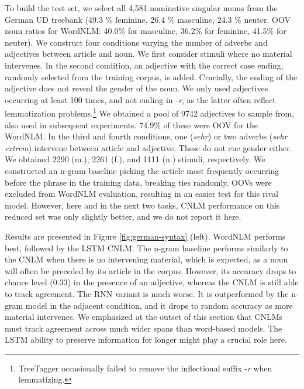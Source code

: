 To build the test set, we select all 4,581 nominative singular nouns
from the German UD treebank (49.3 \% feminine, 26.4 \% masculine, 24.3
\% neuter. OOV noun ratios %
for WordNLM: 40.0\% for masculine, 36.2\% for feminine, 41.5\% for
neuter). %
We construct four conditions varying the number of adverbs and
adjectives between article and noun.  We first consider stimuli where
no material
intervenes. %
In the second condition, an adjective with the correct case ending,
randomly selected from the training corpus, is added. Crucially, the
ending of the adjective does not reveal the gender of the noun.  We
only used adjectives occurring at least 100 times, and not ending in
-\emph{r}, as the latter often reflect lemmatization
problems.\footnote{TreeTagger occasionally failed to remove the
  inflectional suffix -\emph{r} when lemmatizing.}  We obtained a pool
of 9742 adjectives to sample from, also used in subsequent
experiments.  74.9\% of these were OOV for the WordNLM.  In the third
and fourth conditions, one (\emph{sehr}) or two adverbs (\emph{sehr
  extrem}) intervene between article and adjective. These do
not cue gender either. We obtained 2290 (m.), 2261 (f.), and 1111 (n.)
stimuli, respectively. We constructed an n-gram baseline picking the
article most frequently occurring before the phrase in the training
data, breaking ties randomly. OOVs were excluded from WordNLM
evaluation, resulting in an easier test for this rival model. However,
here and in the next two tasks, CNLM performance on this reduced set
was only slightly better, and we do not report it here.

Results are presented in Figure \ref{fig:german-syntax}
(left). WordNLM performs best, followed by the LSTM CNLM.  The n-gram
baseline performs similarly to the CNLM when there is no intervening
material, which is expected, as a noun will often be preceded by its
article in the corpus. However, its accuracy drops to chance level
(0.33) in the presence of an adjective, whereas the CNLM is still able
to track agreement. %
The RNN variant is much worse. It is outperformed by the n-gram model
in the adjacent condition, and it drops to random accuracy as more
material intervenes. We emphasized at the outset of this section that
CNLMs must track agreement across much wider spans than
word-based models. The LSTM ability to preserve information for
longer might play a crucial role here.

